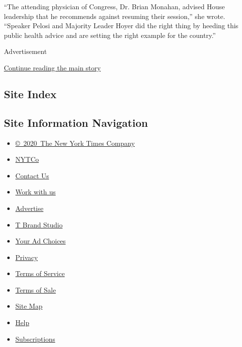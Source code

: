 ``The attending physician of Congress, Dr. Brian Monahan, advised House
leadership that he recommends against resuming their session,'' she
wrote. ``Speaker Pelosi and Majority Leader Hoyer did the right thing by
heeding this public health advice and are setting the right example for
the country.''

Advertisement

\protect\hyperlink{after-bottom}{Continue reading the main story}

\hypertarget{site-index}{%
\subsection{Site Index}\label{site-index}}

\hypertarget{site-information-navigation}{%
\subsection{Site Information
Navigation}\label{site-information-navigation}}

\begin{itemize}
\tightlist
\item
  \href{https://help.nytimes.com/hc/en-us/articles/115014792127-Copyright-notice}{©~2020~The
  New York Times Company}
\end{itemize}

\begin{itemize}
\tightlist
\item
  \href{https://www.nytco.com/}{NYTCo}
\item
  \href{https://help.nytimes.com/hc/en-us/articles/115015385887-Contact-Us}{Contact
  Us}
\item
  \href{https://www.nytco.com/careers/}{Work with us}
\item
  \href{https://nytmediakit.com/}{Advertise}
\item
  \href{http://www.tbrandstudio.com/}{T Brand Studio}
\item
  \href{https://www.nytimes.com/privacy/cookie-policy\#how-do-i-manage-trackers}{Your
  Ad Choices}
\item
  \href{https://www.nytimes.com/privacy}{Privacy}
\item
  \href{https://help.nytimes.com/hc/en-us/articles/115014893428-Terms-of-service}{Terms
  of Service}
\item
  \href{https://help.nytimes.com/hc/en-us/articles/115014893968-Terms-of-sale}{Terms
  of Sale}
\item
  \href{https://spiderbites.nytimes.com}{Site Map}
\item
  \href{https://help.nytimes.com/hc/en-us}{Help}
\item
  \href{https://www.nytimes.com/subscription?campaignId=37WXW}{Subscriptions}
\end{itemize}
